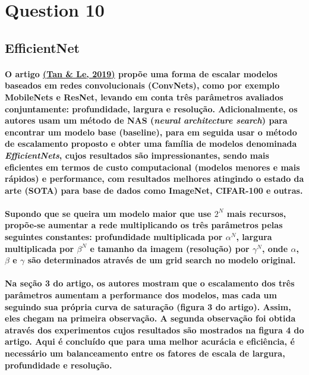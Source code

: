 \documentclass[a4paper]{article}    %
\begin{document}
\newpage
\setcounter{section}{10}
\setcounter{subsection}{0}
\section*{Question 10}

\subsection{EfficientNet}
\paragraph{O artigo \href{https://arxiv.org/pdf/1905.11946.pdf}{(Tan \& Le, 2019)} propõe uma forma de escalar modelos baseados em redes convolucionais (ConvNets), como por exemplo MobileNets e ResNet, levando em conta três parâmetros avaliados conjuntamente: profundidade, largura e resolução. Adicionalmente, os autores usam um método de NAS (\emph{neural architecture search}) para encontrar um modelo base (baseline), para em seguida usar o método de escalamento proposto e obter uma família de modelos denominada \emph{EfficientNets}, cujos resultados são impressionantes, sendo mais eficientes em termos de custo computacional (modelos menores e mais rápidos) e performance, com resultados melhores atingindo o estado da arte (SOTA) para base de dados como ImageNet, CIFAR-100 e outras.}

\paragraph{Supondo que se queira um modelo maior que use $2^N$ mais recursos, propõe-se aumentar a rede multiplicando os três parâmetros pelas seguintes constantes: profundidade multiplicada por $\alpha^N$, largura multiplicada por $\beta^N$ e tamanho da imagem (resolução) por $\gamma^N$, onde $\alpha$, $\beta$ e $\gamma$ são determinados através de um grid search no modelo original.}

\paragraph{Na seção 3 do artigo, os autores mostram que o escalamento dos três parâmetros aumentam a performance dos modelos, mas cada um seguindo sua própria curva de saturação (figura 3 do artigo). Assim, eles chegam na primeira observação. A segunda observação foi obtida através dos experimentos cujos resultados são mostrados na figura 4 do artigo. Aqui é concluído que para uma melhor acurácia e eficiência, é necessário um balanceamento entre os fatores de escala de largura, profundidade e resolução.}
\end{document}
